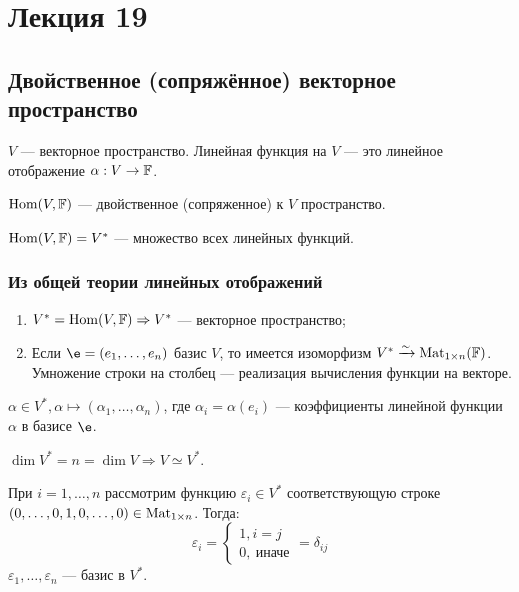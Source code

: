 \section*{Лекция 19}
%
\subsection*{Двойственное (сопряжённое) векторное пространство}
%
$V$ --- векторное пространство. Линейная функция на $V$ --- это линейное отображение $\alpha: V \rightarrow \mathbb{F}$.

\begin{Def}
  $\mathrm{Hom}(V, \mathbb{F})$ --- двойственное (сопряженное) к $V$ пространство.
\end{Def}

\begin{Designation}
  $\mathrm{Hom}(V, \mathbb{F}) = V^{*}$ --- множество всех линейных функций.
\end{Designation}

\subsubsection*{Из общей теории линейных отображений}
\begin{enumerate}
  \item $V^{*} = \mathrm{Hom}(V, \mathbb{F}) \Rightarrow V^{*}$ --- векторное пространство;
  \item Если $\e = (e_1, \ldots, e_n)$ базис $V$, то имеется изоморфизм $V^{*} \xrightarrow{\sim} \mathrm{Mat}_{1 \times n}(\mathbb{F})$. Умножение строки на столбец --- реализация вычисления функции на векторе.
\end{enumerate}

$\alpha \in V^{*}, \alpha \mapsto (\alpha_1, \ldots, \alpha_n)$, где $\alpha_i = \alpha(e_i)$ --- коэффициенты линейной функции $\alpha$ в базисе $\e$.
\begin{Consequence}
  $\dim V^{*} = n = \dim V \Rightarrow V \simeq V^{*}$.
\end{Consequence}

При $i = 1, \ldots, n$ рассмотрим функцию $\varepsilon_i \in V^{*}$ соответствующую строке $(0, \ldots, 0, 1, 0, \ldots, 0) \in \mathrm{Mat}_{1 \times n}$. Тогда:
\[
\varepsilon_i =
\begin{cases}
  1, i = j \\
  0,\ \text{иначе}
\end{cases}
= \delta_{ij}
\]
$\varepsilon_1, \ldots, \varepsilon_n$ --- базис в $V^{*}$.

